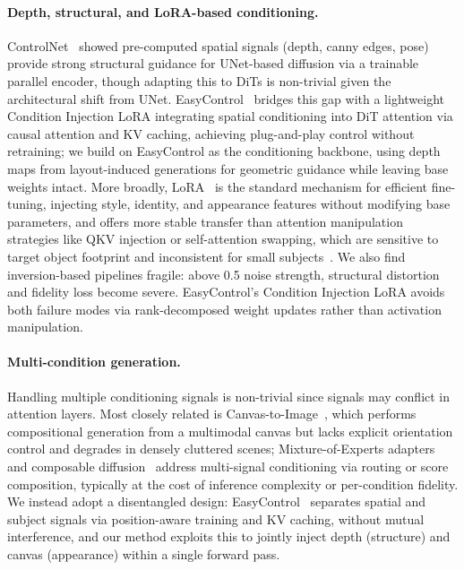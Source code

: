\paragraph{Depth, structural, and LoRA-based conditioning.}
ControlNet~\cite{zhang2023adding} showed pre-computed spatial signals (depth, canny edges, pose) provide strong structural guidance for UNet-based diffusion via a trainable parallel encoder, though adapting this to DiTs is non-trivial given the architectural shift from UNet.
EasyControl~\cite{zhang2025easycontrol} bridges this gap with a lightweight Condition Injection LoRA integrating spatial conditioning into DiT attention via causal attention and KV caching, achieving plug-and-play control without retraining; we build on EasyControl as the conditioning backbone, using depth maps from layout-induced generations for geometric guidance while leaving base weights intact.
More broadly, LoRA~\cite{hu2022lora} is the standard mechanism for efficient fine-tuning, injecting style, identity, and appearance features without modifying base parameters, and offers more stable transfer than attention manipulation strategies like QKV injection or self-attention swapping, which are sensitive to target object footprint and inconsistent for small subjects~\cite{hertz2022prompt, mokady2023null, tumanyan2023plug}.
We also find inversion-based pipelines fragile: above 0.5 noise strength, structural distortion and fidelity loss become severe.
EasyControl's Condition Injection LoRA avoids both failure modes via rank-decomposed weight updates rather than activation manipulation.

\paragraph{Multi-condition generation.}
Handling multiple conditioning signals is non-trivial since signals may conflict in attention layers.
Most closely related is Canvas-to-Image~\cite{dalva2025canvastoimage}, which performs compositional generation from a multimodal canvas but lacks explicit orientation control and degrades in densely cluttered scenes; Mixture-of-Experts adapters~\cite{wu2024mole} and composable diffusion~\cite{liu2022compositional} address multi-signal conditioning via routing or score composition, typically at the cost of inference complexity or per-condition fidelity.
We instead adopt a disentangled design: EasyControl~\cite{zhang2025easycontrol} separates spatial and subject signals via position-aware training and KV caching, without mutual interference, and our method exploits this to jointly inject depth (structure) and canvas (appearance) within a single forward pass.


